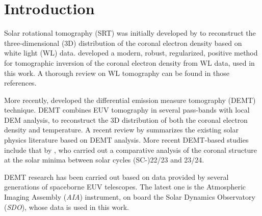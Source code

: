 \documentclass[baaa]{baaa}
\begin{document}

\maketitle

\section{Introduction}\label{intro}

Solar rotational tomography (SRT) was initially developed by \citet{altschuler_1972} to reconstruct the three-dimensional (3D) distribution of the coronal electron density based on white light (WL) data. \citet{frazin_2002} developed a modern, robust, regularized, positive method for tomographic inversion of the coronal electron density from WL data, used in this work. A thorough review on WL tomography can be found in those references.

More recently, \citet{frazin_2009} developed the differential emission measure tomography (DEMT) technique. DEMT combines EUV tomography in several pass-bands with local DEM analysis, to reconstruct the 3D distribution of both the coronal electron density and temperature. A recent review by \citet{vasquez_2016} summarizes the existing solar physics literature based on DEMT analysis. {More recent DEMT-based studies include that by} \citet{lloveras_2017}, who carried out a comparative analysis of the coronal structure at the solar minima between solar cycles (SC-)22/23 and 23/24.

DEMT research has been carried out based on data provided by several generations of spaceborne EUV telescopes. The latest one is the Atmospheric Imaging Assembly (\textsl{AIA}) instrument, on board the Solar Dynamics Observatory (\textsl{SDO}), whose data is used in this work.
\end{document}
